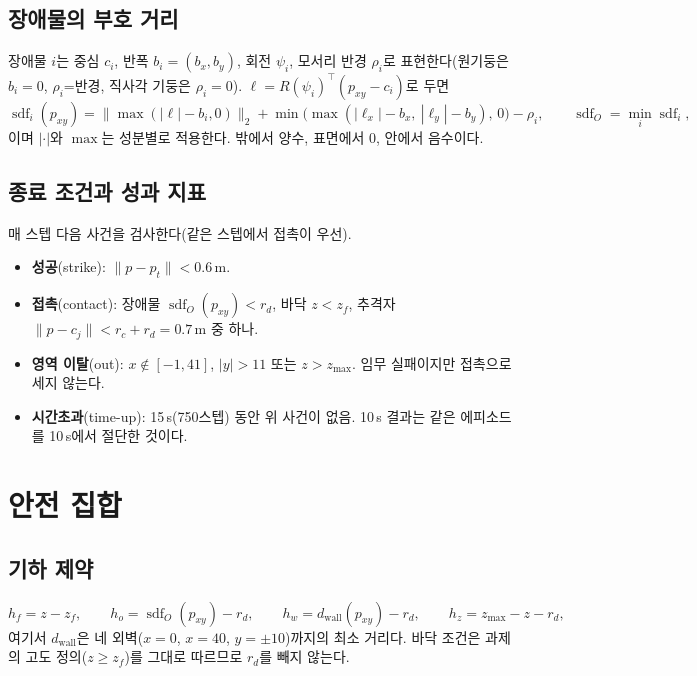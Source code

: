 \documentclass[10pt,a4paper]{article}
\newcommand{\sdf}{\operatorname{sdf}}
\begin{document}
\subsection{장애물의 부호 거리}
장애물 $i$는 중심 $c_i$, 반폭 $b_i=(b_x,b_y)$, 회전 $\psi_i$, 모서리 반경 $\rho_i$로 표현한다(원기둥은 $b_i=0$, $\rho_i$=반경, 직사각 기둥은 $\rho_i=0$).
$\ell=R(\psi_i)^\top(p_{xy}-c_i)$로 두면
\begin{equation}
\sdf_i(p_{xy})=\big\|\max(|\ell|-b_i,0)\big\|_2+\min\!\big(\max(|\ell_x|-b_x,\ |\ell_y|-b_y),\,0\big)-\rho_i,\qquad
\sdf_O=\min_i\sdf_i ,
\label{eq:sdf}
\end{equation}
이며 $|\cdot|$와 $\max$는 성분별로 적용한다. 밖에서 양수, 표면에서 0, 안에서 음수이다.

\subsection{종료 조건과 성과 지표}\label{sec:outcomes}
매 스텝 다음 사건을 검사한다(같은 스텝에서 접촉이 우선).
\begin{itemize}
\item \textbf{성공}(strike): $\|p-p_t\|<0.6$\,m.
\item \textbf{접촉}(contact): 장애물 $\sdf_O(p_{xy})<r_d$, 바닥 $z<z_f$, 추격자 $\|p-c_j\|<r_c+r_d=0.7$\,m 중 하나.
\item \textbf{영역 이탈}(out): $x\notin[-1,41]$, $|y|>11$ 또는 $z>z_{\max}$. 임무 실패이지만 접촉으로 세지 않는다.
\item \textbf{시간초과}(time-up): 15\,s(750스텝) 동안 위 사건이 없음. 10\,s 결과는 같은 에피소드를 10\,s에서 절단한 것이다.
\end{itemize}

\section{안전 집합}\label{sec:safe}

\subsection{기하 제약}
\begin{equation}
h_f=z-z_f,\qquad h_o=\sdf_O(p_{xy})-r_d,\qquad h_w=d_{\mathrm{wall}}(p_{xy})-r_d,\qquad h_z=z_{\max}-z-r_d,
\label{eq:geo}
\end{equation}
여기서 $d_{\mathrm{wall}}$은 네 외벽($x=0$, $x=40$, $y=\pm10$)까지의 최소 거리다.
바닥 조건은 과제의 고도 정의($z\ge z_f$)를 그대로 따르므로 $r_d$를 빼지 않는다.
\end{document}

